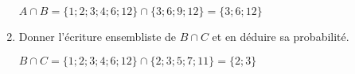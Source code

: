 \documentclass[openany]{book}
\begin{document}
\begin{minipage}{0.5\linewidth}
\begin{enumerate}
$A \cap B = \lbrace 1;2;3;4;6;12\rbrace \cap \lbrace 3;6;9;12\rbrace =  \lbrace 3;6;12\rbrace$ 



\item Donner l'écriture ensembliste de $B \cap C$ et en déduire sa probabilité.

$B \cap C = \lbrace 1;2;3;4;6;12\rbrace \cap \lbrace 2;3;5;7;11 \rbrace =  \lbrace 2;3\rbrace$ 


\end{enumerate}

\end{minipage}

\newpage
\end{document}
